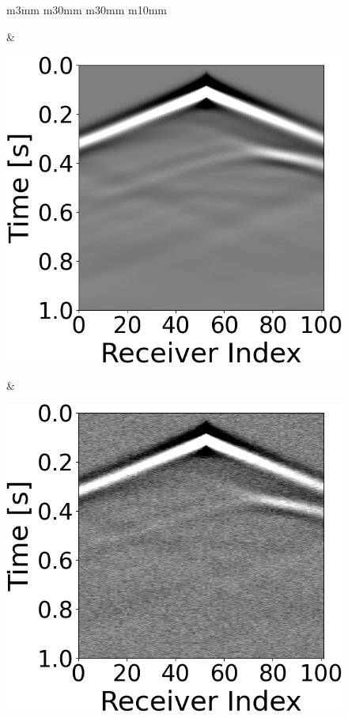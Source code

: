 \begin{figure}[t]
    \centering
    \begin{tabular}{m{3mm} m{30mm} m{30mm} m{10mm}}
        \begin{minipage}[b]{\linewidth}\end{minipage} &

        \begin{minipage}[b]{\linewidth}
            \centering
            \includegraphics[width=\linewidth]{public/seismic_data}
            \caption*{}
        \end{minipage} &
        \begin{minipage}[b]{\linewidth}
            \centering
            \includegraphics[width=\linewidth]{public/seismic_data_noisy}

\end{minipage}
\end{tabular}
\end{figure}
